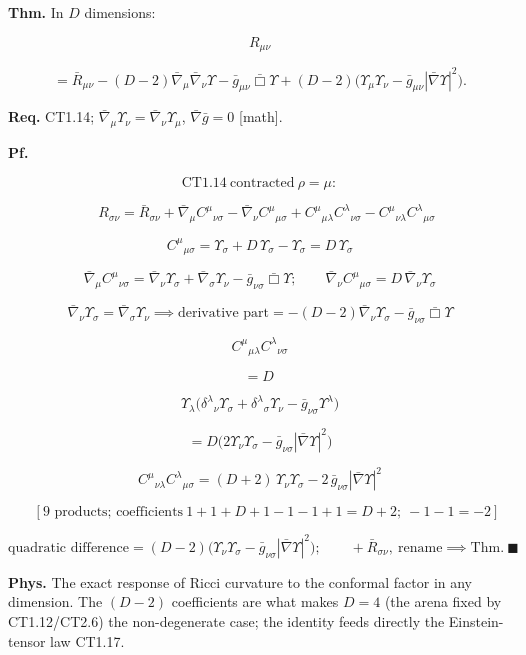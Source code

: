 \begin{theorem}\label{tag:CT1-15}
\textbf{Thm.} In $D$ dimensions:

\[
R_{\mu\nu}
\]

\[
= \bar R_{\mu\nu}-(D-2)\bar\nabla_\mu\bar\nabla_\nu\Upsilon-\bar g_{\mu\nu}\bar\Box\Upsilon+(D-2)\bigl(\Upsilon_\mu\Upsilon_\nu-\bar g_{\mu\nu}|\bar\nabla\Upsilon|^2\bigr).
\]

\textbf{Req.} CT1.14; $\bar\nabla_\mu\Upsilon_\nu=\bar\nabla_\nu\Upsilon_\mu$, $\bar\nabla\bar g=0$ [math].

\textbf{Pf.}

\[
\mathrm{CT1.14}\ \text{contracted}\ \rho=\mu:
\]

\[
\quad R_{\sigma\nu}=\bar R_{\sigma\nu}+\bar\nabla_\mu C^\mu{}_{\nu\sigma}-\bar\nabla_\nu C^\mu{}_{\mu\sigma}+C^\mu{}_{\mu\lambda}C^\lambda{}_{\nu\sigma}-C^\mu{}_{\nu\lambda}C^\lambda{}_{\mu\sigma}
\]

\[
C^\mu{}_{\mu\sigma}=\Upsilon_\sigma+D\,\Upsilon_\sigma-\Upsilon_\sigma=D\,\Upsilon_\sigma
\]

\[
\bar\nabla_\mu C^\mu{}_{\nu\sigma}=\bar\nabla_\nu\Upsilon_\sigma+\bar\nabla_\sigma\Upsilon_\nu-\bar g_{\nu\sigma}\bar\Box\Upsilon;\qquad
\bar\nabla_\nu C^\mu{}_{\mu\sigma}=D\,\bar\nabla_\nu\Upsilon_\sigma
\]

\[
\bar\nabla_\nu\Upsilon_\sigma=\bar\nabla_\sigma\Upsilon_\nu\implies\text{derivative part}=-(D-2)\bar\nabla_\nu\Upsilon_\sigma-\bar g_{\nu\sigma}\bar\Box\Upsilon
\]

\[
C^\mu{}_{\mu\lambda}C^\lambda{}_{\nu\sigma}
\]

\[
= D\,
\]

\[
\Upsilon_\lambda\bigl(\delta^\lambda{}_\nu\Upsilon_\sigma+\delta^\lambda{}_\sigma\Upsilon_\nu-\bar g_{\nu\sigma}\Upsilon^\lambda\bigr)
\]

\[
= D\bigl(2\Upsilon_\nu\Upsilon_\sigma-\bar g_{\nu\sigma}|\bar\nabla\Upsilon|^2\bigr)
\]

\[
C^\mu{}_{\nu\lambda}C^\lambda{}_{\mu\sigma}=(D+2)\,\Upsilon_\nu\Upsilon_\sigma-2\,\bar g_{\nu\sigma}|\bar\nabla\Upsilon|^2
\]

\[
\quad [\text{9 products; coefficients}\ 1{+}1{+}D{+}1{-}1{-}1{+}1{=}D{+}2;\ {-}1{-}1{=}{-}2]
\]

\[
\text{quadratic difference}=(D-2)\bigl(\Upsilon_\nu\Upsilon_\sigma-\bar g_{\nu\sigma}|\bar\nabla\Upsilon|^2\bigr);\qquad
+\bar R_{\sigma\nu},\ \text{rename}\implies\text{Thm}.\ \blacksquare
\]

\textbf{Phys.} The exact response of Ricci curvature to the conformal factor in any dimension. The $(D-2)$ coefficients are what makes $D=4$ (the arena fixed by CT1.12/CT2.6) the non-degenerate case; the identity feeds directly the Einstein-tensor law CT1.17.

\end{theorem}

